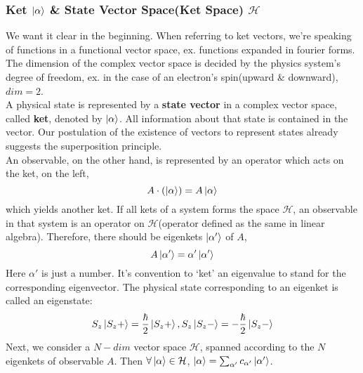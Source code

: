 \documentclass[a4paper, 11pt]{article}
\begin{document}
\subsubsection{Ket $\ket{\alpha}$ \& State Vector Space(Ket Space) $\mathcal{H}$}
We want it clear in the beginning. When referring to ket vectors, we're speaking of functions in a functional vector space, ex. functions expanded in fourier forms.
The dimension of the complex vector space is decided by the physics system's degree of freedom, ex. in the case of an electron's spin(upward \& downward), $dim = 2$.\\
\indent A physical state is represented by a \textbf{state vector} in a complex vector space, called \textbf{ket}, denoted by $\ket{\alpha}$. All information about that state is contained in the vector. Our postulation of the existence of vectors to represent states already suggests the superposition principle.\\
An observable, on the other hand, is represented by an operator which acts on the ket, on the left,\\
\begin{equation}
A \cdot (\ket{\alpha}) = A\ket{\alpha}
\end{equation}
\indent which yields another ket. If all kets of a system forms the space $\mathcal{H}$, an observable in that system is an operator on $\mathcal{H}$(operator defined as the same in linear algebra). Therefore, there should be eigenkets $\ket{\alpha'}$ of $A$,
\begin{equation}
A\ket{\alpha'} = \alpha' \ket{\alpha'}
\end{equation}
\indent Here $\alpha'$ is just a number. It's convention to `ket' an eigenvalue to stand for the corresponding eigenvector.
The physical state corresponding to an eigenket is called an eigenstate:
\begin{equation}
S_z\ket{S_z +} = \frac{\hbar}{2} \ket{S_z +}, S_z\ket{S_z -} = - \frac{\hbar}{2} \ket{S_z -}
\end{equation}
\indent Next, we consider a $N-dim$ vector space $\mathcal{H}$, spanned according to the $N$ eigenkets of observable $A$. Then $\forall \ket{\alpha} \in \mathcal{H}$, $\ket{\alpha} = \sum_{\alpha'} c_{\alpha'}\ket{\alpha'}$.
\end{document}
